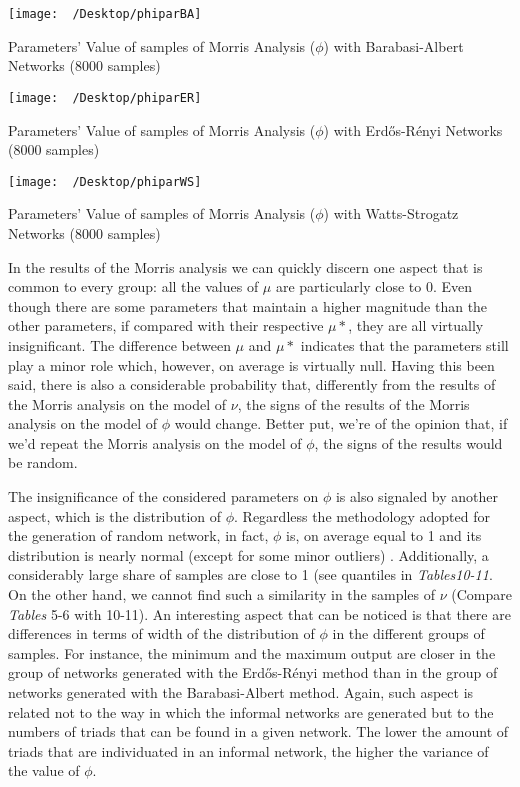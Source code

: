 \documentclass{article}
\begin{document}
\begin{table}
\centering
\texttt{[image: ~/Desktop/phiparBA]}\caption{Parameters' Value of samples of Morris Analysis ($\phi$) with Barabasi-Albert Networks (8000 samples)}
\end{table}
\begin{table}
\centering
\texttt{[image: ~/Desktop/phiparER]}\caption{Parameters' Value of samples of Morris Analysis ($\phi$) with Erdős-Rényi Networks (8000 samples)}
\end{table}
\begin{table}
\centering
\texttt{[image: ~/Desktop/phiparWS]}\caption{Parameters' Value of samples of Morris Analysis ($\phi$) with Watts-Strogatz Networks (8000 samples)}
\end{table}




 

In the results of the Morris analysis we can quickly discern one aspect that is common to every group: all the values of $\mu$ are particularly close to 0. Even though there are some parameters that maintain a higher magnitude than the other parameters, if compared with their respective $\mu*$, they are all virtually insignificant. The difference between $\mu$ and $\mu*$ indicates that the parameters still play a minor role which, however, on average is virtually null. 
Having this been said, there is also a considerable probability that, differently from the results of the Morris analysis on the model of $\nu$, the signs of the results of the Morris analysis on the model of $\phi$ would change. Better put, we’re of the opinion that, if we’d repeat the Morris analysis on the model of $\phi$, the signs of the results would be random.

The insignificance of the considered parameters on $\phi$ is also signaled by another aspect, which is the distribution of $\phi$. Regardless the methodology adopted for the generation of random network, in fact, $\phi$ is, on average equal to 1 and its distribution is nearly normal (except for some minor outliers) . Additionally, a considerably large share of samples are close to 1 (see quantiles in \emph{Tables10-11}. On the other hand, we cannot find such a similarity in the samples of $\nu$ (Compare \emph{Tables} 5-6 with 10-11). 
An interesting aspect that can be noticed is that there are differences in terms of width of the distribution of $\phi$ in the different groups of samples. For instance, the minimum and the maximum output are closer in the group of networks generated with the Erdős-Rényi method than in the group of networks generated with the Barabasi-Albert method.  Again, such aspect is related not to the way in which the informal networks are generated but to the numbers of triads that can be found in a given network. The lower the amount of triads that are individuated in an informal network, the higher the variance of the value of $\phi$. 
\end{document}
